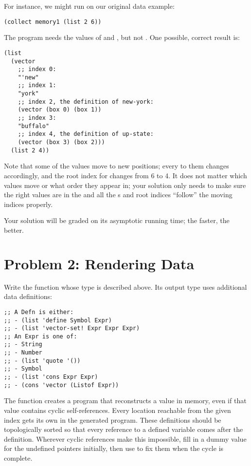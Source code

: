 \documentclass{article}
\begin{document}
For instance, we might run  on our original data example:
\begin{verbatim}
(collect memory1 (list 2 6))
\end{verbatim}
The program needs the values of  and , but not
.  One possible, correct result is:
\begin{verbatim}
(list
  (vector
    ;; index 0:
    "'new"
    ;; index 1:
    "york"
    ;; index 2, the definition of new-york:
    (vector (box 0) (box 1))
    ;; index 3:
    "buffalo"
    ;; index 4, the definition of up-state:
    (vector (box 3) (box 2)))
  (list 2 4))
\end{verbatim}
Note that some of the values move to new positions; every  to them
changes accordingly, and the root index for  changes from 6 to 4.
It does not matter which values move or what order they appear in; your solution
only needs to make sure the right values are in the  and all the
s and root indices ``follow'' the moving indices properly.

\medskip

Your solution will be graded on its asymptotic running time; the faster, the
better.

\newpage
\section{Problem 2: Rendering Data}


Write the function  whose type is described above.  Its output
type uses additional data definitions:

\begin{verbatim}
;; A Defn is either:
;; - (list 'define Symbol Expr)
;; - (list 'vector-set! Expr Expr Expr)
;; An Expr is one of:
;; - String
;; - Number
;; - (list 'quote '())
;; - Symbol
;; - (list 'cons Expr Expr)
;; - (cons 'vector (Listof Expr))
\end{verbatim}

The function  creates a program that reconstructs a value in
memory, even if that value contains cyclic self-references.  Every location
reachable from the given index gets its own  in the generated
program.  These definitions should be topologically sorted so that every
reference to a defined variable comes after the definition.  Wherever cyclic
references make this impossible, fill in a dummy value for the undefined
pointers initially, then use  to fix them when the cycle is
complete.
\end{document}
